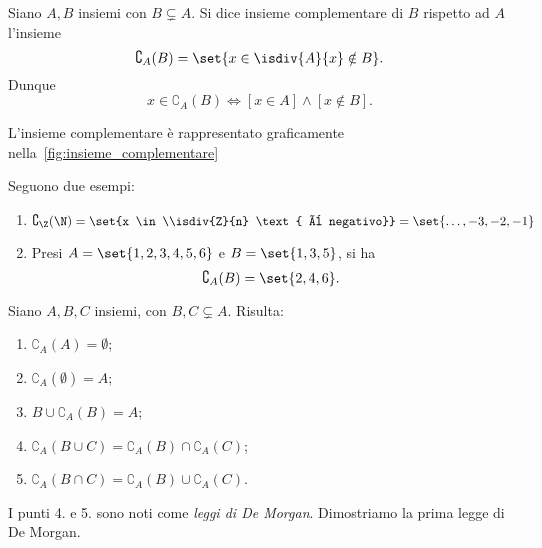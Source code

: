 \begin{definition}\label{def:insieme_complementare}
    Siano \(A, B\) insiemi con \(B \subsetneq A\). Si dice insieme complementare di \(B\) rispetto ad \(A\) l'insieme
    \[
        \complement_A(B) = \set{x \in \isdiv{A}{x} \notin B}.
    \]
    Dunque
    \[
        x \in \complement_A(B) \iff [x \in A] \land [x \notin B].
    \]
\end{definition}
L'insieme complementare è rappresentato graficamente nella~\cref{fig:insieme_complementare}



\begin{examples}
    Seguono due esempi:
    \begin{enumerate}
        \item \(\complement_\Z(\N) = \set{x \in \\isdiv{Z}{n} \text{ è negativo}} = \set{\dotsc, -3, -2, -1}\)
        \item Presi \(A = \set{1, 2, 3, 4, 5, 6}\) e \(B = \set{1, 3, 5}\), si ha
        \[
            \complement_A(B) = \set{2, 4, 6}.
        \]
    \end{enumerate}
\end{examples}


\begin{proposition}\label{prop:de_morgan_complementare}
    Siano \(A, B, C\) insiemi, con \(B,C \subsetneq A\). Risulta:
    \begin{enumerate}[label=\textnormal{\arabic*}.]
        \item \(\complement_A(A) = \emptyset\);
        \item \(\complement_A(\emptyset) = A\);
        \item \(B \cup \complement_A(B) = A\);
        \item \(\complement_A(B \cup C) = \complement_A(B) \cap \complement_A(C)\);
        \item \(\complement_A(B \cap C) = \complement_A(B) \cup \complement_A(C)\).
    \end{enumerate}
\end{proposition}
I punti 4. e 5. sono noti come \emph{leggi di De Morgan}. Dimostriamo la prima legge di De Morgan.

